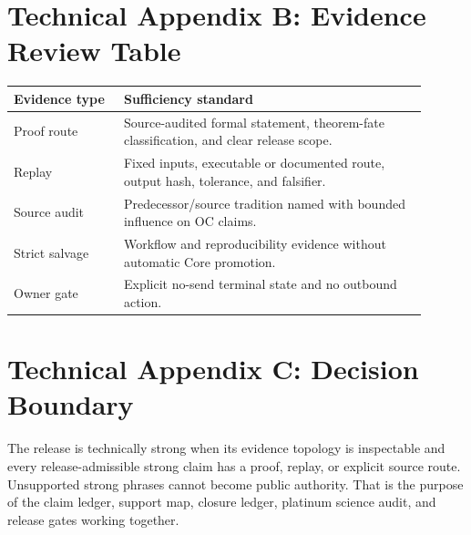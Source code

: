 \documentclass[11pt,a4paper]{article}
\begin{document}
\section*{Technical Appendix B: Evidence Review Table}
\begin{longtable}{>{\raggedright\arraybackslash}p{0.24\linewidth}>{\raggedright\arraybackslash}p{0.66\linewidth}}
\textbf{Evidence type} & \textbf{Sufficiency standard}\\
\hline
Proof route & Source-audited formal statement, theorem-fate classification, and clear release scope.\\
Replay & Fixed inputs, executable or documented route, output hash, tolerance, and falsifier.\\
Source audit & Predecessor/source tradition named with bounded influence on OC claims.\\
Strict salvage & Workflow and reproducibility evidence without automatic Core promotion.\\
Owner gate & Explicit no-send terminal state and no outbound action.\\
\end{longtable}

\clearpage
\section*{Technical Appendix C: Decision Boundary}
The release is technically strong when its evidence topology is inspectable and every release-admissible strong claim has a proof, replay, or explicit source route. Unsupported strong phrases cannot become public authority. That is the purpose of the claim ledger, support map, closure ledger, platinum science audit, and release gates working together.
\end{document}
